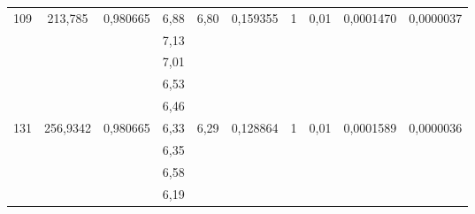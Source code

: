 \documentclass[a4paper, 12pt]{article}
\begin{document}
\begin{table}[h!]
\begin{tabular}{|c|c|c|c|c|c|c|c|c|c|}
\multirow{5}{*}{109} & \multirow{5}{*}{213,785}  & \multirow{5}{*}{0,980665} & 6,88           & \multirow{5}{*}{6,80}     & \multirow{5}{*}{0,159355}          & \multirow{5}{*}{1} & \multirow{5}{*}{0,01}   & \multirow{5}{*}{0,0001470} & \multirow{5}{*}{0,0000037}    \\ \cline{4-4}
                     &                           &                           & 7,13           &                           &                                    &                    &                         &                            &                               \\ \cline{4-4}
                     &                           &                           & 7,01           &                           &                                    &                    &                         &                            &                               \\ \cline{4-4}
                     &                           &                           & 6,53           &                           &                                    &                    &                         &                            &                               \\ \cline{4-4}
                     &                           &                           & 6,46           &                           &                                    &                    &                         &                            &                               \\ \hline
\multirow{5}{*}{131} & \multirow{5}{*}{256,9342} & \multirow{5}{*}{0,980665} & 6,33           & \multirow{5}{*}{6,29}     & \multirow{5}{*}{0,128864}          & \multirow{5}{*}{1} & \multirow{5}{*}{0,01}   & \multirow{5}{*}{0,0001589} & \multirow{5}{*}{0,0000036}    \\ \cline{4-4}
                     &                           &                           & 6,35           &                           &                                    &                    &                         &                            &                               \\ \cline{4-4}
                     &                           &                           & 6,58           &                           &                                    &                    &                         &                            &                               \\ \cline{4-4}
                     &                           &                           & 6,19           &                           &                                    &                    &                         &                            &                               \\ \cline{4-4}

\end{tabular}
\end{table}
\end{document}
